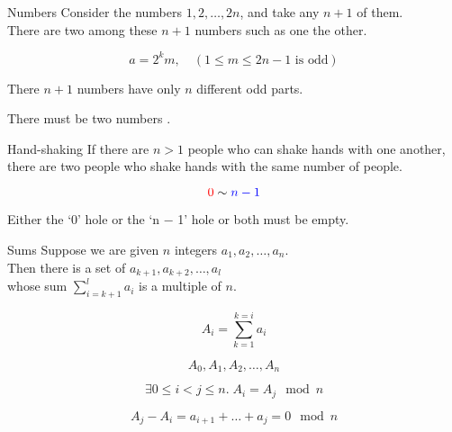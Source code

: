 \begin{frame}{}
  \begin{exampleblock}{Numbers}
    Consider the numbers $1, 2, \dots, 2n$, and take any $n+1$ of them. \\
    There are two among these $n+1$ numbers such as one  the other.
  \end{exampleblock}

  \pause
  \vspace{0.30cm}
  \begin{center}
    \[
      a = 2^{k} m, \quad (1 \le m \le 2n-1 \text{ is odd})
    \]

    There $n+1$ numbers have only $n$ different odd parts.

    \vspace{0.30cm}
    There must be two numbers .
  \end{center}
\end{frame}

\begin{frame}{}
  \begin{exampleblock}{Hand-shaking}
    If there are $n > 1$ people who can shake hands with one another, \\
    there are two people who shake hands with the same number of people.
  \end{exampleblock}

  \pause
  \[
    \textcolor{red}{0} \sim \textcolor{blue}{n-1}
  \]

  \pause
  \vspace{0.30cm}
  \begin{center}
    Either the `0' hole or the `n − 1' hole or both must be empty.
  \end{center}
\end{frame}

\begin{frame}{}
  \begin{exampleblock}{Sums}
    Suppose we are given $n$ integers $a_{1}, a_{2}, \dots, a_{n}$. \\
    Then there is a set of 
    $a_{k+1}, a_{k+2}, \dots, a_{l}$ \\
    whose sum $\sum\limits_{i=k+1}^{l} a_{i}$ is a multiple of $n$.
  \end{exampleblock}

  \pause
  \[
    A_{i} = \sum_{k=1}^{k=i} a_{i}
  \]

  \pause
  \[
    A_{0}, A_{1}, A_{2}, \dots, A_{n}
  \]

  \pause
  \[
    \exists 0 \le i < j \le n.\; A_{i} = A_{j} \mod{n}
  \]

  \pause
  \[
    A_{j} - A_{i} = a_{i+1} + \dots + a_{j} = 0 \mod{n}
  \]
\end{frame}

